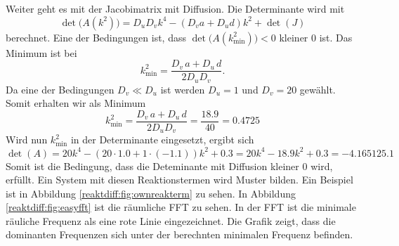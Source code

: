 Weiter geht es mit der Jacobimatrix mit Diffusion.
Die Determinante wird mit
\begin{equation*}
    \det\bigl(A(k^2)\bigr) = D_u D_v k^4 - (D_v a + D_u d) k^2 + \det(J)
\end{equation*}
berechnet.
Eine der Bedingungen ist, dass \( \det\bigl( A(k_{\min}^2)\bigr) < 0 \) kleiner 0 ist.
Das Minimum ist bei
\begin{equation*}
    k^2_{\text{min}} = \frac{D_v\, a + D_u \, d}{2 D_u D_v}.
\end{equation*}
Da eine der Bedingungen \(D_v \ll D_u\) ist werden \(D_u = 1\) und \(D_v = 20\) gewählt.
Somit erhalten wir als Minimum
\begin{equation*}
    k^2_{\text{min}} = \frac{D_v\, a + D_u\, d}{2 D_u D_v} = \frac{18.9}{40} = 0.4725
\end{equation*}
Wird nun \(k^2_{\text{min}}\) in der Determinante eingesetzt, ergibt sich
\begin{equation}
    \det(A) = 20k^4 - (20 \cdot 1.0 + 1 \cdot (-1.1))k^2 + 0.3 = 20k^4 - 18.9k^2 + 0.3
     = -4.165125.1
\end{equation}
Somit ist die Bedingung, dass die Deteminante mit Diffusion kleiner 0 wird, erfüllt.
Ein System mit diesen Reaktionstermen wird Muster bilden.
Ein Beispiel ist in Abbildung \ref{reaktdiff:fig:ownreakterm} zu sehen.
In Abbildung \ref{reaktdiff:fig:easyfft} ist die räumliche FFT zu sehen.
In der FFT ist die minimale räuliche Frequenz als eine rote Linie eingezeichnet.
Die Grafik zeigt, dass die dominanten Frequenzen sich unter der berechnten minimalen Frequenz befinden.

